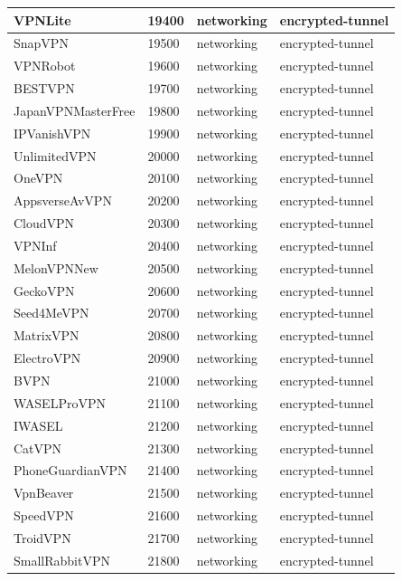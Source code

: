 \begin{longtable}{p{}|p{}|p{}|p{}}
    VPNLite &	19400 &	networking &	encrypted-tunnel \\ \hline
    SnapVPN &	19500 &	networking &	encrypted-tunnel \\ \hline
    VPNRobot &	19600 &	networking &	encrypted-tunnel \\ \hline
    BESTVPN &	19700 &	networking &	encrypted-tunnel \\ \hline
    JapanVPNMasterFree &	19800 &	networking &	encrypted-tunnel \\ \hline
    IPVanishVPN &	19900 &	networking &	encrypted-tunnel \\ \hline
    UnlimitedVPN &	20000 &	networking &	encrypted-tunnel \\ \hline
    OneVPN &	20100 &	networking &	encrypted-tunnel \\ \hline
    AppsverseAvVPN &	20200 &	networking &	encrypted-tunnel \\ \hline
    CloudVPN &	20300 &	networking &	encrypted-tunnel \\ \hline
    VPNInf &	20400 &	networking &	encrypted-tunnel \\ \hline
    MelonVPNNew &	20500 &	networking &	encrypted-tunnel \\ \hline
    GeckoVPN &	20600 &	networking &	encrypted-tunnel \\ \hline
    Seed4MeVPN &	20700 &	networking &	encrypted-tunnel \\ \hline
    MatrixVPN &	20800 &	networking &	encrypted-tunnel \\ \hline
    ElectroVPN &	20900 &	networking &	encrypted-tunnel \\ \hline
    BVPN &	21000 &	networking &	encrypted-tunnel \\ \hline
    WASELProVPN &	21100 &	networking &	encrypted-tunnel \\ \hline
    IWASEL &	21200 &	networking &	encrypted-tunnel \\ \hline
    CatVPN &	21300 &	networking &	encrypted-tunnel \\ \hline
    PhoneGuardianVPN &	21400 &	networking &	encrypted-tunnel \\ \hline
    VpnBeaver &	21500 &	networking &	encrypted-tunnel \\ \hline
    SpeedVPN &	21600 &	networking &	encrypted-tunnel \\ \hline
    TroidVPN &	21700 &	networking &	encrypted-tunnel \\ \hline
    SmallRabbitVPN &	21800 &	networking &	encrypted-tunnel \\ \hline

\end{longtable}

